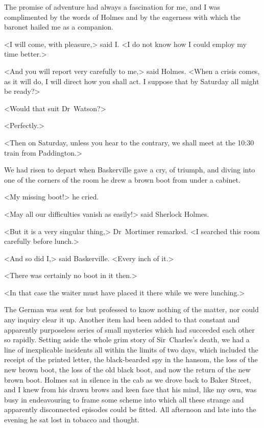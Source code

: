 The promise of adventure had always a fascination for me, and I was complimented by the words of Holmes and by the eagerness with which the baronet hailed me as a companion.

<I will come, with pleasure,> said I\@. <I do not know how I could employ my time better.>

<And you will report very carefully to me,> said Holmes. <When a crisis comes, as it will do, I will direct how you shall act. I suppose that by Saturday all might be ready?>

<Would that suit Dr~Watson?>

<Perfectly.>

<Then on Saturday, unless you hear to the contrary, we shall meet at the 10:30 train from Paddington.>

We had risen to depart when Baskerville gave a cry, of triumph, and diving into one of the corners of the room he drew a brown boot from under a cabinet.

<My missing boot!> he cried.

<May all our difficulties vanish as easily!> said Sherlock Holmes.

<But it is a very singular thing,> Dr~Mortimer remarked. <I searched this room carefully before lunch.>

<And so did I,> said Baskerville. <Every inch of it.>

<There was certainly no boot in it then.>

<In that case the waiter must have placed it there while we were lunching.>

The German was sent for but professed to know nothing of the matter, nor could any inquiry clear it up. Another item had been added to that constant and apparently purposeless series of small mysteries which had succeeded each other so rapidly. Setting aside the whole grim story of Sir~Charles's death, we had a line of inexplicable incidents all within the limits of two days, which included the receipt of the printed letter, the black-bearded spy in the hansom, the loss of the new brown boot, the loss of the old black boot, and now the return of the new brown boot. Holmes sat in silence in the cab as we drove back to Baker Street, and I knew from his drawn brows and keen face that his mind, like my own, was busy in endeavouring to frame some scheme into which all these strange and apparently disconnected episodes could be fitted. All afternoon and late into the evening he sat lost in tobacco and thought.

